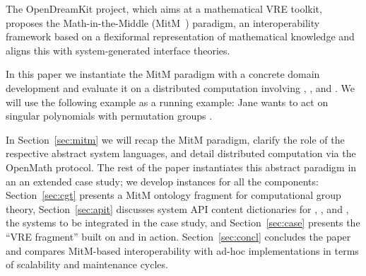 The OpenDreamKit project, which aims at a mathematical VRE toolkit, proposes the Math-in-the-Middle (MitM~\cite{DehKohKon:iop16}) paradigm, an interoperability framework based on a flexiformal
representation of mathematical knowledge and aligns this with system-generated interface theories. 

In this paper we instantiate the MitM paradigm with a concrete domain
development and evaluate it on a distributed computation involving \GAP, \Sage, and \Singular.
We will use the following example as a running example: Jane wants to act on singular polynomials with \GAP permutation groups
.

In Section~\ref{sec:mitm} we will recap the MitM paradigm, clarify the role of the respective abstract system languages, and detail distributed computation via the OpenMath \SCSCP protocol.  The rest of the paper instantiates this abstract paradigm in an an extended case study; we develop instances for all the components: Section~\ref{sec:cgt} presents a MitM ontology fragment for computational group theory, Section~\ref{sec:apit} discusses system API content dictionaries for \GAP, \Sage, and \Singular, the systems to be integrated in the case study, and Section~\ref{sec:case} presents the ``VRE fragment'' built on \GAP and \Singular in action.  Section~\ref{sec:concl} concludes the paper and compares MitM-based interoperability with ad-hoc implementations in terms of scalability and maintenance cycles.


